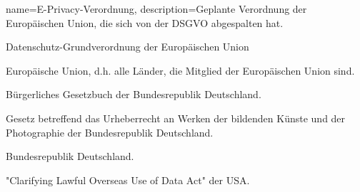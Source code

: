 {
    name={E-Privacy-Verordnung},
    description={Geplante Verordnung der Europäischen Union, die sich von der DSGVO abgespalten hat.}
}

{
    Datenschutz-Grundverordnung der Europäischen Union
}

{  
    Europäische Union, d.h. alle Länder, die Mitglied der Europäischen Union sind.
}

{
    Bürgerliches Gesetzbuch der Bundesrepublik Deutschland.
}

{
    Gesetz betreffend das Urheberrecht an Werken der bildenden Künste und der Photographie der Bundesrepublik Deutschland.
}

{
    Bundesrepublik Deutschland.
}

{
    "Clarifying Lawful Overseas Use of Data Act" der USA.
}
